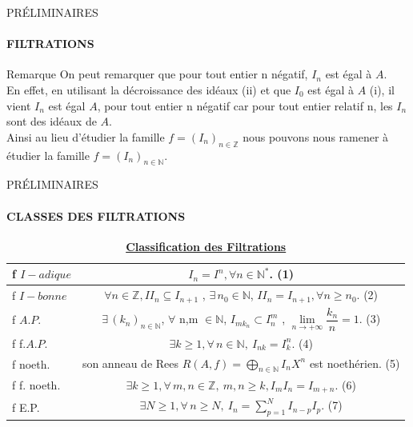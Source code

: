 \documentclass[11pt,a4paper]{beamer}
\begin{document}
		\begin{frame}{PRÉLIMINAIRES}
		\framesubtitle{FILTRATIONS}
		\begin{alertblock}{Remarque}
		On peut remarquer que pour tout entier n négatif, $ I_n$ est égal à  $A$.\\ En effet, en utilisant la décroissance des idéaux (ii) et que $I_0$ est égal à $A$ (i), il vient $I_n$ est égal $A$, pour tout entier n négatif car pour tout entier relatif n, les $I_n$ sont des idéaux de $A$.\\
		Ainsi au lieu d'étudier la famille $f = (I_n)_{n \in \mathbb{Z}}$ nous pouvons nous ramener à étudier la famille $f = (I_n)_{n \in \mathbb{N}}$.
		\end{alertblock}
	\end{frame}
		\begin{frame}{PRÉLIMINAIRES}
		\framesubtitle{CLASSES DES FILTRATIONS}
		\begin{block}{}
			\begin{table}
				\begin{center}
					\begin{tabular}{|l|c|}
						\hline
						f $I-adique$ & $I_n=I^n,\forall n \in \mathbb{N}^*$. (1)\\
						\hline
						f $I-bonne$ & $\forall n \in \mathbb{Z}, II_n \subseteq I_{n+1} $ , $\exists \, n_0 \in \mathbb{N}$, $II_n = I_{n+1}, \forall n \geqslant n_0.$ (2)\\
						\hline
						f $A.P.$ &$\exists \, (k_n)_{n\in \mathbb{N}} $, $\forall$ n,m $\in \mathbb{N}$, $I_{mk_n} \subset I_n^{m}$ , $\underset{n\longrightarrow +\infty }{\lim }\dfrac{k_{n}}{n}=1$. (3)\\
						\hline
						f f.$A.P.$ &$\exists k\geqslant 1, \forall \, n \in \mathbb{N}, \ I_{nk} = I_k^n$. (4)\\
						\hline
						f noeth. & son anneau de Rees ${R}(A,f) =\displaystyle \bigoplus_{n \in \mathbb{N}}{I_n X^n}$ est noethérien. (5)\\
						\hline
						f f. noeth. & $\exists k\geqslant 1, \forall \, m, n \in \mathbb{Z}, \ m, n \geqslant k, I_m I_n = I_{m+n}$. (6)\\
						\hline
						f E.P. & $\exists N\geqslant 1, \forall \, n \geqslant N, \ I_n =\sum\limits_{p=1}^{N} I_{n-p}I_p.$ (7)\\
						\hline
					\end{tabular}
					
				\end{center}
				\caption{\underline{\textbf{Classification des Filtrations}}}
			\end{table}
		
		\end{block}
	\end{frame}	
	
\end{document}
